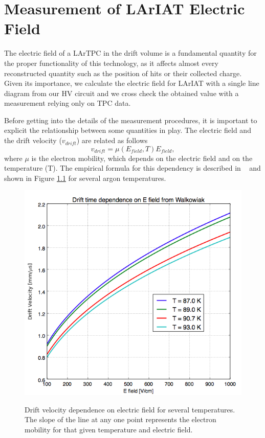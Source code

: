 \chapter{Measurement of LArIAT Electric Field}\label{ch:AppendixB}
The electric field of a LArTPC in the drift volume is a fundamental quantity for the proper functionality of this technology, as it affects almost every reconstructed quantity such as the position of hits or their collected charge. Given its importance, we calculate the electric field for LArIAT with a single line diagram from our HV circuit and we cross check the obtained value with a measurement relying only on TPC data. 

Before getting into the details of the measurement procedures, it is important to explicit the relationship between some  quantities in play. The electric field and the drift velocity ($v_{drift}$) are related as follows 
\begin{equation} v_{drift} = \mu(E_{field},T) E_{field}, \label{eq:vd}
\end{equation}
where $\mu$ is the electron mobility, which depends on the electric field and on the temperature (T). The empirical formula for this dependency is described in ~\cite{WWW} and shown in Figure \ref{fig:EV} for several argon temperatures.

\begin{figure}[htb]
\centering
\includegraphics[scale=0.45]{./AppendixB-EField/Images/Walkowiak.png}\\
\caption{Drift velocity dependence on electric field for several temperatures. The slope of the line at any one point represents the electron mobility for that given temperature and electric field.}
\label{fig:EV}
\end{figure}



